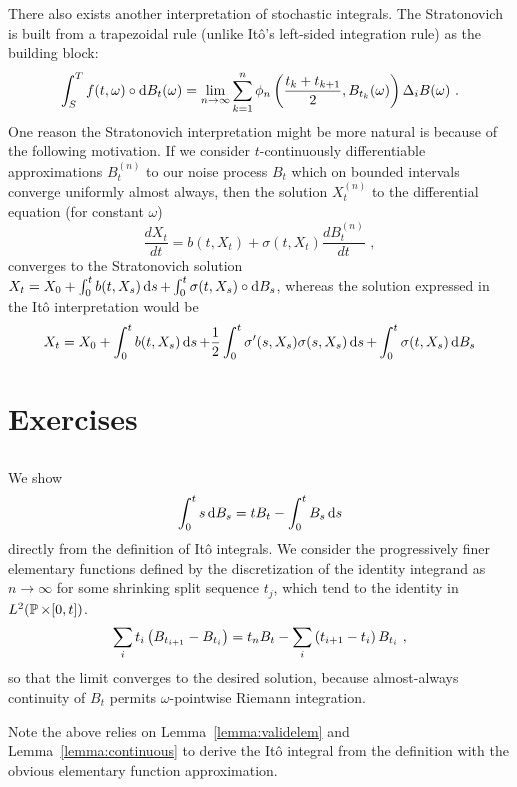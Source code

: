 \documentclass{article}
\begin{document}
There also exists another interpretation of stochastic integrals. The Stratonovich is built from a trapezoidal rule (unlike It\^{o}'s left-sided integration rule) as the building block:
  \[
\int_S^Tf(t, \omega)\circ \d{B_t(\omega)}=\lim_{n\rightarrow\infty}\sum_{k=1}^n\phi_n\pa{\frac{t_k+t_{k+1}}{2}, B_{t_k}(\omega)}\Delta_i B(\omega)\,\,.
\]
One reason the Stratonovich interpretation might be more natural is because of the following motivation. If we consider \(t\)-continuously differentiable approximations \(B_t^{(n)}\) to our noise process \(B_t\) which on bounded intervals converge uniformly almost always, then the solution \(X^{(n)}_t\) to the differential equation (for constant \(\omega\))
\[
\frac{d X_t}{dt}=b(t,X_t)+\sigma(t,X_t)\frac{dB_t^{(n)}}{dt}\,\,,
\]
converges to the Stratonovich solution \(X_t=X_0+\int_0^tb(t, X_s)\d{s}+\int_0^t\sigma(t, X_s)\circ\d{B_s}\), whereas the solution expressed in the It\^{o} interpretation would be
\[
  X_t=X_0+\int_0^tb(t, X_s)\d{s}+\frac{1}{2}\int_0^{t}\sigma'(s, X_s)\sigma(s, X_s)\d{s}+\int_0^t\sigma(t, X_s)\d{B_s}
  \]

\section{Exercises}

\subsection{}
\label{pt1}
We show
\[
  \int_0^t s\d{B_s}=tB_t-\int_0^tB_s\d{s}
\]
directly from the definition of It\^{o} integrals. We consider the progressively finer elementary functions defined by the discretization of the identity integrand as \(n\rightarrow\infty\) for some shrinking split sequence \(t_j\), which tend to the identity in \(L^2(\P\times[0,t])\).
\[
  \sum_it_i\pa{B_{t_{i+1}}-B_{t_{i}}}=  t_nB_t-\sum_i\pa{t_{i+1}-t_{i}}B_{t_i}\,\,,
\]
so that the limit converges to the desired solution, because almost-always continuity of \(B_t\) permits \(\omega\)-pointwise Riemann integration.

Note the above relies on Lemma~\ref{lemma:validelem} and Lemma~\ref{lemma:continuous} to derive the It\^{o} integral from the definition with the obvious elementary function approximation.

\subsection{}
\label{pt2}
\end{document}
